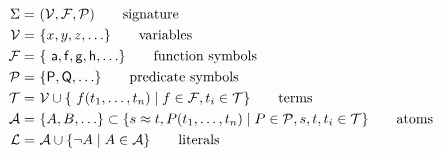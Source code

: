 \begin{example}
	\vspace{-1em}
\begin{align*}
 \Sigma = &\ (\SIGV, \SIGF, \SIGP) 						
 \tag*{signature}
 \\
 \SIGV = &\ \{x,y,z,\ldots\}									
 \tag*{variables}
 \\
 \SIGF = &\ \{ \ma,\mf,\mg,\mh,\ldots \}			
 \tag*{function symbols}
 \\
 \SIGP = &\ \{ \mP, \mQ, \ldots\}																			
 \tag*{predicate symbols} 
 \\
 \SIGT = &\ \SIGV \cup \{ f(t_1,\ldots,t_n)\mid f\in\SIGF, t_i \in \SIGT \}			
 \tag*{terms}
 \\
\SIGA = &\ \{ A, B, \ldots\} \subset \{ s\foEQ t, P ( t_1, \ldots, t_n )\mid P\in\SIGP, s,t,t_i \in \SIGT\}
\tag*{atoms}
\\
\SIGL = &\ \SIGA \cup \{ \lnot A \mid A\in \SIGA \}
\tag*{literals}
\\
\end{align*}
\end{example}



